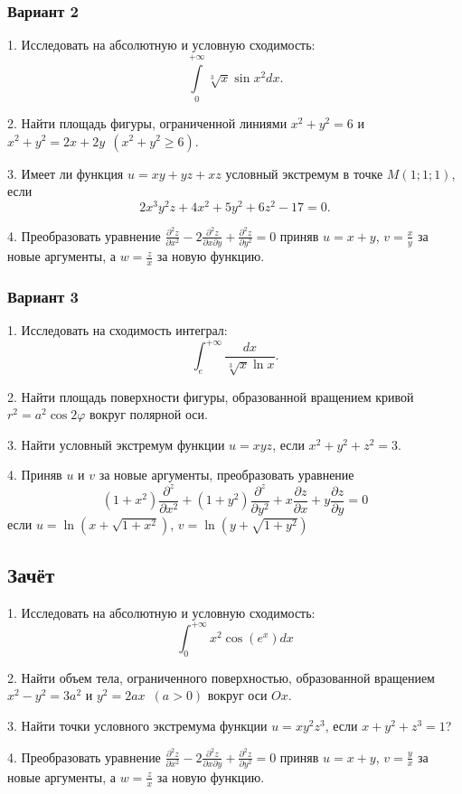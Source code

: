 \documentclass[a4paper]{article}
\begin{document}
\subsubsection{Вариант 2}

1. Исследовать на абсолютную и условную сходимость:
$$
\int\limits_0^{+\infty}\sqrt[3]{x}\sin x^2dx.
$$

2. Найти площадь фигуры, ограниченной линиями $x^2+y^2=6$ и
$x^2+y^2=2x+2y\ \ (x^2+y^2\ge 6)$.

3. Имеет ли функция $u=xy+yz+xz$ условный экстремум в точке
$M(1;1;1)$, если
$$2x^3y^2z+4x^2+5y^2+6z^2-17=0.$$

4. Преобразовать уравнение
$\displaystyle\frac{\partial^2z}{\partial
x^2}-2\frac{\partial^2z}{\partial x\partial y}+\frac{\partial^2
z}{\partial y^2}=0$ приняв $u=x+y$, $v=\displaystyle\frac{x}{y}$
за новые аргументы, а $w=\frac{z}{x}$ за новую функцию.

\subsubsection{Вариант 3}

1. Исследовать на сходимость интеграл:
$$
\int_e^{+\infty}\frac{dx}{\sqrt[3]x\ln x}.
$$

2. Найти площадь поверхности фигуры, образованной вращением кривой
$r^2=a^2\cos 2\varphi$ вокруг полярной оси.

3. Найти условный экстремум функции $u=xyz$, если $x^2+y^2+z^2=3$.

4. Приняв $u$ и $v$ за новые аргументы, преобразовать уравнение
$$
(1+x^2)\frac{\partial^z}{\partial
x^2}+(1+y^2)\frac{\partial^z}{\partial y^2}+x\frac{\partial
z}{\partial x}+y\frac{\partial z}{\partial y}=0
$$
если $u=\ln (x+\sqrt{1+x^2})$, $v=\ln (y+\sqrt{1+y^2})$

\subsection{Зачёт }

1. Исследовать на абсолютную и условную сходимость:
$$
\int_0^{+\infty}x^2\cos (e^x)dx
$$

2. Найти объем тела, ограниченного поверхностью, образованной
вращением $x^2-y^2=3a^2$ и $y^2=2ax$\ $(a>0)$ вокруг оси $Ox$.

3. Найти точки условного экстремума функции $u=xy^2z^3$, если
$x+y^2+z^3=1$?

4. Преобразовать уравнение $\displaystyle\frac{\partial^2
z}{\partial x^2}-2\frac{\partial^2z}{\partial x\partial
y}+\frac{\partial^2z}{\partial y^2}=0$ приняв $u=x+y$,
$v=\displaystyle\frac{y}{x}$ за новые аргументы, а
$w=\displaystyle\frac{z}{x}$ за новую функцию.
\end{document}
